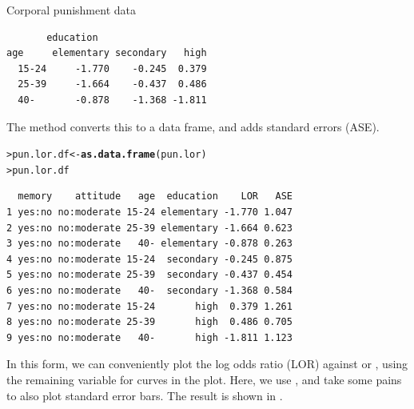 \documentclass[10pt,krantz2]{krantz}\usepackage[]{graphicx}\usepackage[]{color}
\makeatletter
\newcommand{\hlstd}[1]{\textcolor[rgb]{0.345,0.345,0.345}{#1}}%
\newcommand{\hlkwb}[1]{\textcolor[rgb]{0.69,0.353,0.396}{#1}}%
\newcommand{\hlkwd}[1]{\textcolor[rgb]{0.737,0.353,0.396}{\textbf{#1}}}%
\newenvironment{kframe}{%
 \def\at@end@of@kframe{}%
 \ifinner\ifhmode%
  \def\at@end@of@kframe{\end{minipage}}%
  \begin{minipage}{\columnwidth}%
 \fi\fi%
 \def\FrameCommand##1{\hskip\@totalleftmargin \hskip-\fboxsep
 \colorbox{shadecolor}{##1}\hskip-\fboxsep
     \hskip-\linewidth \hskip-\@totalleftmargin \hskip\columnwidth}%
 \MakeFramed {\advance\hsize-\width
   \@totalleftmargin\z@ \linewidth\hsize
   \@setminipage}}%
 {\par\unskip\endMakeFramed%
 \at@end@of@kframe}
\newenvironment{knitrout}{}{} %
\renewenvironment{knitrout}{\small\renewcommand{\baselinestretch}{.85}}{} %
\makeatother
\begin{document}
\begin{Example}[punish2]{Corporal punishment data}
\begin{knitrout}
\begin{kframe}
\begin{verbatim}
       education
age     elementary secondary   high
  15-24     -1.770    -0.245  0.379
  25-39     -1.664    -0.437  0.486
  40-       -0.878    -1.368 -1.811
\end{verbatim}
\end{kframe}
\end{knitrout}
The  method converts this to a data frame, and adds standard errors (ASE).
\begin{knitrout}
\color{fgcolor}\begin{kframe}
\begin{alltt}
\hlstd{> }\hlstd{pun.lor.df} \hlkwb{<-} \hlkwd{as.data.frame}\hlstd{(pun.lor)}
\hlstd{> }\hlstd{pun.lor.df}
\end{alltt}
\begin{verbatim}
  memory    attitude   age  education    LOR   ASE
1 yes:no no:moderate 15-24 elementary -1.770 1.047
2 yes:no no:moderate 25-39 elementary -1.664 0.623
3 yes:no no:moderate   40- elementary -0.878 0.263
4 yes:no no:moderate 15-24  secondary -0.245 0.875
5 yes:no no:moderate 25-39  secondary -0.437 0.454
6 yes:no no:moderate   40-  secondary -1.368 0.584
7 yes:no no:moderate 15-24       high  0.379 1.261
8 yes:no no:moderate 25-39       high  0.486 0.705
9 yes:no no:moderate   40-       high -1.811 1.123
\end{verbatim}
\end{kframe}
\end{knitrout}
In this form, we can conveniently plot the log odds ratio (LOR) against  or ,
using the remaining variable for curves in the plot. Here, we use , and take some pains to
also plot standard error bars.  The result is shown in .


\end{Example}
\end{document}
